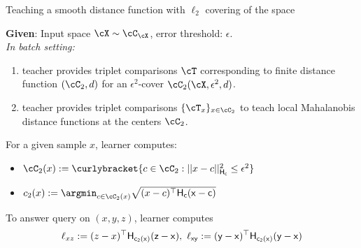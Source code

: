 \begin{algorithm}[t]
\caption{Teaching a smooth distance function with $\ell_2$ covering of the space}
\label{alg: smoothdistl2}
\textbf{Given}: Input space $\cX \sim \cC_{\cX}$, error threshold: $\epsilon$.\\
\vspace{1mm}
\textit{In batch setting:}\vspace{1mm}
\begin{enumerate}
    \item teacher provides triplet comparisons $\cT$ corresponding to finite distance function $(\cC_2, d)$ for an $\epsilon^2$-cover $\cC_2(\cX,\epsilon^2,d)$.
    \item teacher provides triplet comparisons $\{\cT_x\}_{x \in \cC_2}$ to teach local Mahalanobis distance functions at the centers $\cC_2$.
\end{enumerate}
For a given sample $x$, learner computes:
\begin{itemize}
    \item $\cC_2(x) := \curlybracket{c \in \cC_2: ||x - c ||_{\sf{H}_c}^2 \le \epsilon^2}$ 
    \item $c_2(x) := \argmin_{c \in \cC_2(x)} \sqrt{(x-c)^{\top}\sf{H}_c(x-c)}$
\end{itemize}
\vspace{1mm}
To answer query on $(x,y,z)$, learner computes 
\begin{gather*}
  \ell_{xz} := (z - x)^{\top}\sf{H}_{c_2(x)}(z - x),\,\, \ell_{xy} := (y - x)^{\top}\sf{H}_{c_2(x)}(y - x)  \\

\end{gather*}
\end{algorithm}
